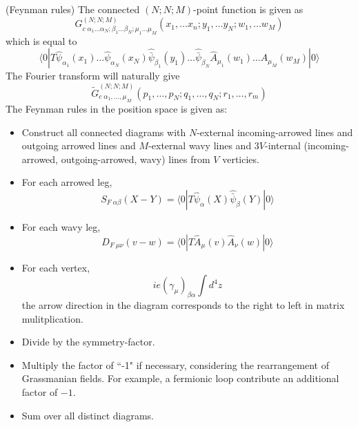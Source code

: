 \begin{defi}
(Feynman rules) The connected $(N;N;M)$-point function is given as 
\[G^{(N;N;M)}_{c\;\alpha _{1}\ldots \alpha _{N};\beta_1\ldots \beta _{N};\mu_1\ldots \mu _{M}}(x_1,\ldots x_{n};y_1,\ldots y_{N};w_1,\ldots w_{M})\]
which is equal to
\[\langle 0|T\hat{\psi }_{\alpha_1}(x_1)\ldots \hat{\psi }_{\alpha _{N}}(x_{N})\hat{\bar{\psi }}_{\beta_1}(y_1)\ldots \hat{\bar{\psi }}_{\beta _{N}}\hat{A}_{\mu_1}(w_1)\ldots \hat{A}_{\mu _{M}}(w_{M})|0\rangle \]
The Fourier transform will naturally give
\[\tilde{G}^{(N;N;M)}_{c\;\alpha_1,\ldots ,\mu _{M}}(p_1,\ldots ,p_{N};q_{1},\ldots ,q_{N};r_{1},\ldots ,r_{m})\]
The Feynman rules in the position space is given as:
\begin{itemize}
\item[(i)] Construct all connected diagrams with $N$-external incoming-arrowed lines and outgoing arrowed lines and $M$-external wavy lines and $3V$-internal (incoming-arrowed, outgoing-arrowed, wavy) lines from $V$ verticies.  
\item[(ii)] For each arrowed leg,
\[S_{F\;\alpha\beta }(X-Y)=\langle 0|T\hat{\psi }_{\alpha }(X)\hat{\bar{\psi }}_{\beta }(Y)|0\rangle \]
\item[(iii)] For each wavy leg,
\[D_{F\;\mu \nu }(v-w)=\langle 0|T\hat{A}_{\mu }(v)\hat{A}_{\nu }(w)|0\rangle \]
\item[(iv)] For each vertex,
\[ie(\gamma _{\mu })_{\beta \alpha }\int d^{4}z\]
the arrow direction in the diagram corresponds to the right to left in matrix mulitplication. 
\item[(v)] Divide by the symmetry-factor.
\item[(vi)] Multiply the factor of ``-1" if necessary, considering the rearrangement of Grassmanian fields. For example, a fermionic loop contribute an additional factor of $-1$. 
\item[(vi)] Sum over all distinct diagrams. 
\end{itemize}
\end{defi}
\vspace{2ex}

